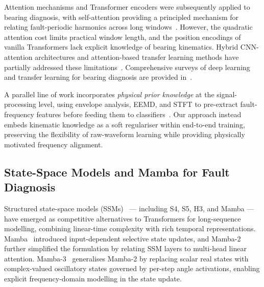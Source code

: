 Attention mechanisms and Transformer encoders were subsequently applied
to bearing diagnosis, with self-attention providing a principled mechanism
for relating fault-periodic harmonics across long
windows~\cite{shao2021transformer_bearing,chen2021vibration_transformer}.
However, the quadratic attention cost limits practical window length,
and the position encodings of vanilla Transformers lack explicit
knowledge of bearing kinematics.
Hybrid CNN-attention architectures and attention-based transfer learning
methods have partially addressed these
limitations~\cite{li2022hybrid_fault,liu2024dat}.
Comprehensive surveys of deep learning and transfer learning for bearing
diagnosis are provided in~\cite{yang2023deep_tl,tama2022review}.

A parallel line of work incorporates \emph{physical prior knowledge}
at the signal-processing level, using envelope analysis,
EEMD, and STFT to pre-extract fault-frequency features before feeding
them to classifiers~\cite{randall2011rolling,smith2015rolling}.
Our approach instead embeds kinematic knowledge as a soft regulariser
within end-to-end training, preserving the flexibility of raw-waveform
learning while providing physically motivated frequency alignment.

\subsection{State-Space Models and Mamba for Fault Diagnosis}
\label{subsec:rel_ssm}

Structured state-space models (SSMs)~\cite{gu2021efficiently} — including
S4, S5, H3, and Mamba — have emerged as competitive alternatives to Transformers
for long-sequence modelling, combining linear-time complexity with rich
temporal representations.
Mamba~\cite{gu2023mamba} introduced input-dependent selective state updates,
and Mamba-2~\cite{mamba2} further simplified the formulation by relating
SSM layers to multi-head linear attention.
Mamba-3~\cite{mamba3_2026} generalises Mamba-2 by replacing scalar real states
with complex-valued oscillatory states governed by per-step angle activations,
enabling explicit frequency-domain modelling in the state update.

